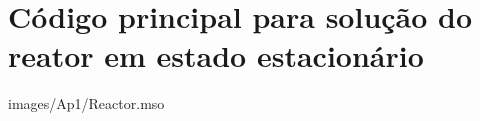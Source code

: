 %
%
%
\chapter{Código principal para solução do reator em estado estacionário}
\label{chap:codigoestacionario}

 {images/Ap1/Reactor.mso}
